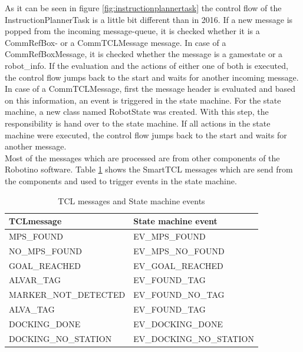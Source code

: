 As it can be seen in figure \ref{fig:instructionplannertask} the control flow of the InstructionPlannerTask is a little bit different than in 2016. If a new message is popped from the incoming message-queue, it is checked whether it is a CommRefBox- or a CommTCLMessage message. In case of a CommRefBoxMessage, it is checked whether the message is a gamestate or a robot\_info. If the evaluation and the actions of either one of both is executed, the control flow jumps back to the start and waits for another incoming message. In case of a CommTCLMessage, first the message header is evaluated and based on this information, an event is triggered in the state machine. For the state machine, a new class named RobotState was created. With this step, the responsibility is hand over to the state machine. If all actions in the state machine were executed, the control flow jumps back to the start and waits for another message. \\ 

Most of the messages which are processed are from other components of the Robotino software. Table \ref{tab:tcl_state} shows the SmartTCL messages which are send from the components and used to trigger events in the state machine. \\

\begin {table}[h]
\caption{TCL messages and State machine events}
\label{tab:tcl_state}
\begin{center}

\begin{tabular}{|l|l|}
\hline 
TCLmessage & State machine event \\ 
\hline 
MPS\_FOUND & EV\_MPS\_FOUND \\ 
\hline 
NO\_MPS\_FOUND & EV\_MPS\_NO\_FOUND \\ 
\hline 
GOAL\_REACHED & EV\_GOAL\_REACHED\\ 
\hline 
ALVAR\_TAG & EV\_FOUND\_TAG \\ 
\hline 
MARKER\_NOT\_DETECTED & EV\_FOUND\_NO\_TAG \\ 
\hline 
ALVA\_TAG & EV\_FOUND\_TAG \\ 
\hline 
DOCKING\_DONE & EV\_DOCKING\_DONE \\ 
\hline 
DOCKING\_NO\_STATION & EV\_DOCKING\_NO\_STATION \\ 
\hline 
\end{tabular} 
\end{center}
\end {table}

